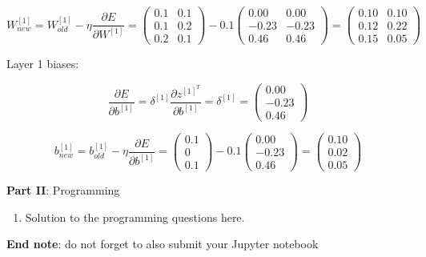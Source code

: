 \documentclass{article}
\begin{document}
\begin{enumerate}[leftmargin=\labelsep]
\begin{equation*}
  W^{[1]}_{new} = W^{[1]}_{old} - \eta \frac{\partial E}{\partial W^{[1]}} =
  \begin{pmatrix}
    0.1 & 0.1 \\
    0.1 & 0.2 \\
    0.2 & 0.1 
  \end{pmatrix} - 0.1
  \begin{pmatrix}
    0.00  & 0.00 \\
    -0.23 & -0.23 \\
    0.46  & 0.46
  \end{pmatrix} =
  \begin{pmatrix}
    0.10 & 0.10 \\
    0.12 & 0.22 \\
    0.15 & 0.05 
  \end{pmatrix} 
\end{equation*}

Layer 1 biases:

\begin{equation*}
  \frac{\partial E}{\partial b^{[1]}} =
  \delta^{[1]} \frac{\partial z^{[1]^T}}{\partial b^{[1]}} =
  \delta^{[1]} =
  \begin{pmatrix}
    0.00  \\
    -0.23 \\
    0.46
    \end{pmatrix}
\end{equation*}

\begin{equation*}
  b^{[1]}_{new} =
  b^{[1]}_{old} - \eta \frac{\partial E}{\partial b^{[1]}} =
  \begin{pmatrix}
    0.1 \\
    0 \\
    0.1
  \end{pmatrix} - 0.1
  \begin{pmatrix}
    0.00  \\
    -0.23 \\
    0.46
    \end{pmatrix} =
  \begin{pmatrix}
    0.10 \\
    0.02 \\
    0.05
    \end{pmatrix}
\end{equation*}

\end{enumerate}

\large{\textbf{Part II}: Programming}\normalsize

\begin{enumerate}[leftmargin=\labelsep,resume]
\item Solution to the programming questions here.
\end{enumerate}

\vskip 1cm
\textbf{End note}: do not forget to also submit your Jupyter notebook

\newpage

\end{document}
